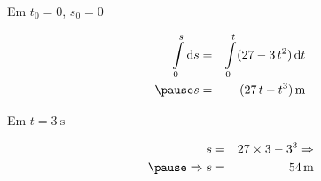 \documentclass[12pt]{beamer}
\begin{document}
\begin{frame}
	Em $t_{0}=0$, $s_{0}=0$\pause
	
	\begin{eqnarray}
		\int\limits_{0}^{s}\text{d}s&=&\int\limits_{0}^{t}(27-3\,t^{2})\,\text{d}t\\\pause
		s&=&(27\,t-t^{3})\,\SI{}{\meter}
	\end{eqnarray}\pause

	Em $t=\SI{3}{\second}$
	
	\begin{eqnarray}
		s&=&27\times 3-3^{3} \Rightarrow\\\pause
		\Rightarrow s&=&\SI{54}{\meter}
	\end{eqnarray}\pause
\end{frame}
\end{document}
